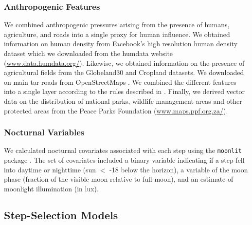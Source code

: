 \documentclass[abstract=on,10pt,a4paper,bibliography=totocnumbered]{article}
\begin{document}
\subsubsection{Anthropogenic Features}

We combined anthropogenic pressures arising from the presence of humans,
agriculture, and roads into a single proxy for human influence. We obtained
information on human density from Facebook's high resolution human density
dataset \citep{Tiecke.2017} which we downloaded from the humdata website
(\url{www.data.humdata.org/}). Likewise, we obtained information on the presence
of agricultural fields from the Globeland30 \citep{Chen.2015} and Cropland
\citep{Xiong.2017} datasets. We downloaded on main tar roads from OpenStreetMaps
\citep{OpenStreetMapContributors.2017}. We combined the different features into
a single layer according to the rules described in \citet{Hofmann.2021}.
Finally, we derived vector data on the distribution of national parks, wildlife
management areas and other protected areas from the Peace Parks Foundation
(\url{www.maps.ppf.org.za/}).

\subsubsection{Nocturnal Variables}

We calculated nocturnal covariates associated with each step using the
\texttt{moonlit} package \citep{Smielak.2023}. The set of covariates included a
binary variable indicating if a step fell into daytime or nighttime (sun $<$ -18
\degree below the horizon), a variable of the moon phase (fraction of the
visible moon relative to full-moon), and an estimate of moonlight illumination
(in lux).

\subsection{Step-Selection Models}
\end{document}
